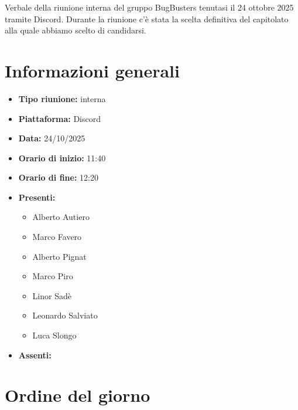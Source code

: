 \documentclass[a4paper,12pt]{article}
\begin{document}
\vspace{0.5cm}

\begin{center}
\begin{tcolorbox}[colback=secondaryblue!10,colframe=secondaryblue,width=0.9\textwidth,arc=3mm,boxrule=0.8pt,title={\bfseries Abstract}]
Verbale della riunione interna del gruppo BugBusters tenutasi il 24 ottobre 2025 tramite Discord. Durante la riunione c'è stata la scelta definitiva del capitolato alla quale abbiamo scelto di candidarsi.
\end{tcolorbox}
\end{center}

\newpage

\tableofcontents
\newpage


\section{Informazioni generali}

\begin{itemize}
    \item \textbf{Tipo riunione:} interna
    \item \textbf{Piattaforma:} Discord
    \item \textbf{Data:} 24/10/2025
    \item \textbf{Orario di inizio:} 11:40
    \item \textbf{Orario di fine:} 12:20
    \item \textbf{Presenti:}
    \begin{itemize}[leftmargin=1.5em, itemsep=3pt, label={\rule[0.5ex]{0.4em}{0.4em}}]
        \item Alberto Autiero
        \item Marco Favero
        \item Alberto Pignat
        \item Marco Piro
        \item Linor Sadè
        \item Leonardo Salviato
        \item Luca Slongo
    \end{itemize}
    \item \textbf{Assenti:}

\end{itemize}

\section{Ordine del giorno}
\end{document}
